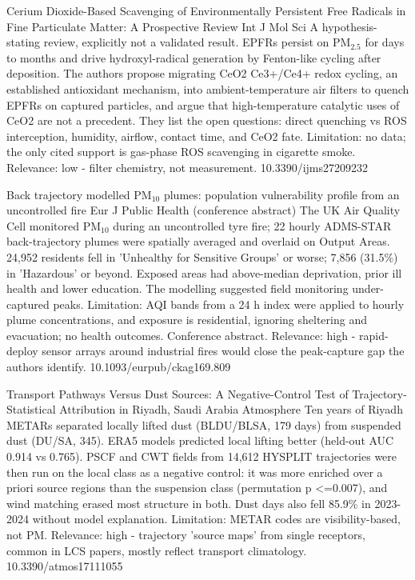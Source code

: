 \documentclass[10pt]{article}
\begin{document}
{Cerium Dioxide-Based Scavenging of Environmentally Persistent Free Radicals in Fine Particulate Matter: A Prospective Review}
{Int J Mol Sci}
{A hypothesis-stating review, explicitly not a validated result. EPFRs persist on PM$_{2.5}$ for days to months and drive hydroxyl-radical generation by Fenton-like cycling after deposition. The authors propose migrating CeO2 Ce3+/Ce4+ redox cycling, an established antioxidant mechanism, into ambient-temperature air filters to quench EPFRs on captured particles, and argue that high-temperature catalytic uses of CeO2 are not a precedent. They list the open questions: direct quenching vs ROS interception, humidity, airflow, contact time, and CeO2 fate. Limitation: no data; the only cited support is gas-phase ROS scavenging in cigarette smoke. Relevance: low - filter chemistry, not measurement.}
{10.3390/ijms27209232}

\par{}\baselineskip{}\baselineskip
{}

{Back trajectory modelled PM$_{10}$ plumes: population vulnerability profile from an uncontrolled fire}
{Eur J Public Health (conference abstract)}
{The UK Air Quality Cell monitored PM$_{10}$ during an uncontrolled tyre fire; 22 hourly ADMS-STAR back-trajectory plumes were spatially averaged and overlaid on Output Areas. 24,952 residents fell in 'Unhealthy for Sensitive Groups' or worse; 7,856 (31.5\%) in 'Hazardous' or beyond. Exposed areas had above-median deprivation, prior ill health and lower education. The modelling suggested field monitoring under-captured peaks. Limitation: AQI bands from a 24 h index were applied to hourly plume concentrations, and exposure is residential, ignoring sheltering and evacuation; no health outcomes. Conference abstract. Relevance: high - rapid-deploy sensor arrays around industrial fires would close the peak-capture gap the authors identify.}
{10.1093/eurpub/ckag169.809}

{Transport Pathways Versus Dust Sources: A Negative-Control Test of Trajectory-Statistical Attribution in Riyadh, Saudi Arabia}
{Atmosphere}
{Ten years of Riyadh METARs separated locally lifted dust (BLDU/BLSA, 179 days) from suspended dust (DU/SA, 345). ERA5 models predicted local lifting better (held-out AUC 0.914 vs 0.765). PSCF and CWT fields from 14,612 HYSPLIT trajectories were then run on the local class as a negative control: it was more enriched over a priori source regions than the suspension class (permutation p <=0.007), and wind matching erased most structure in both. Dust days also fell 85.9\% in 2023-2024 without model explanation. Limitation: METAR codes are visibility-based, not PM. Relevance: high - trajectory 'source maps' from single receptors, common in LCS papers, mostly reflect transport climatology.}
{10.3390/atmos17111055}
\end{document}
